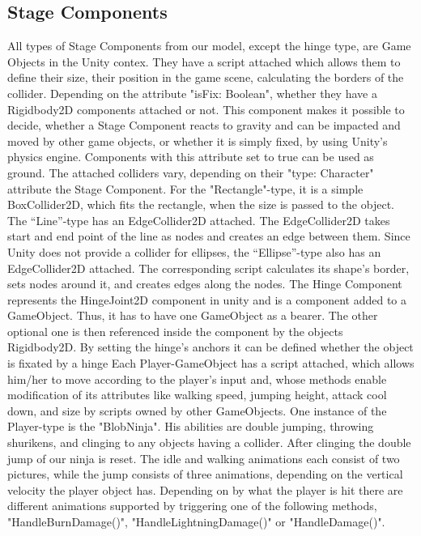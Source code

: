 \subsection{Stage Components}
All types of Stage Components from our model, except the hinge type, are Game Objects in the Unity contex. They have a script attached which allows them to define their size, their position in the game scene, calculating the borders of the collider. Depending on the attribute "isFix: Boolean",  whether they have a Rigidbody2D components attached or not. This component makes it possible to decide, whether a Stage Component reacts to gravity and can be impacted and moved by other game objects, or whether it is simply fixed, by using Unity's physics engine. Components with this attribute set to true can be used as ground. The attached colliders vary, depending on their "type: Character" attribute the Stage Component. For the "Rectangle"-type, it is a simple BoxCollider2D, which fits the rectangle, when the size is passed to the object. The “Line”-type has an EdgeCollider2D attached. The EdgeCollider2D takes start and end point of the line as nodes and creates an edge between them. Since Unity does not provide a collider for ellipses, the “Ellipse”-type also has an EdgeCollider2D attached. The corresponding script calculates its shape’s border, sets nodes around it, and creates edges along the nodes.
The Hinge Component represents the HingeJoint2D component in unity and is a component added to a GameObject. Thus, it has to have one GameObject as a bearer. The other optional one is then referenced inside the component by the objects Rigidbody2D. By setting the hinge's anchors it can be defined whether the object is fixated by a hinge
Each Player-GameObject has a script attached, which allows him/her to move according to the player’s input and, whose methods enable modification of its attributes like walking speed, jumping height, attack cool down, and size by scripts owned by other GameObjects. One instance of the Player-type is the "BlobNinja". His abilities are double jumping, throwing shurikens, and clinging to any objects having a collider. After clinging the double jump of our ninja is reset. The idle and walking animations each consist of two pictures, while the jump consists of three animations, depending on the vertical velocity the player object has. Depending on by what the player is hit there are different animations supported by triggering one of the following methods, "HandleBurnDamage()", "HandleLightningDamage()" or "HandleDamage()".\\
